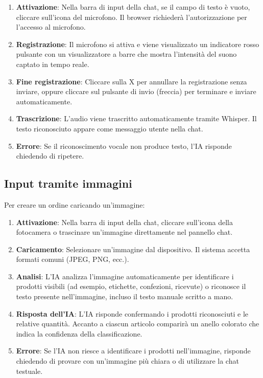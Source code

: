 \begin{enumerate}
    \item \textbf{Attivazione}: Nella barra di input della chat, se il campo di testo \`e vuoto, cliccare sull'icona del microfono. Il browser richieder\`a l'autorizzazione per l'accesso al microfono.
    \item \textbf{Registrazione}: Il microfono si attiva e viene visualizzato un indicatore rosso pulsante con un visualizzatore a barre che mostra l'intensit\`a del suono captato in tempo reale.
    \item \textbf{Fine registrazione}: Cliccare sulla X per annullare la registrazione senza inviare, oppure cliccare sul pulsante di invio (freccia) per terminare e inviare automaticamente.
    \item \textbf{Trascrizione}: L'audio viene trascritto automaticamente tramite Whisper. Il testo riconosciuto appare come messaggio utente nella chat.
    \item \textbf{Errore}: Se il riconoscimento vocale non produce testo, l'IA risponde chiedendo di ripetere.
\end{enumerate}

\subsection{Input tramite immagini}

Per creare un ordine caricando un'immagine:

\begin{enumerate}
    \item \textbf{Attivazione}: Nella barra di input della chat, cliccare sull'icona della fotocamera o trascinare un'immagine direttamente nel pannello chat.
    \item \textbf{Caricamento}: Selezionare un'immagine dal dispositivo. Il sistema accetta formati comuni (JPEG, PNG, ecc.).
    \item \textbf{Analisi}: L'IA analizza l'immagine automaticamente per identificare i prodotti visibili (ad esempio, etichette, confezioni, ricevute) o riconosce il testo presente nell'immagine, incluso il testo manuale scritto a mano.
    \item \textbf{Risposta dell'IA}: L'IA risponde confermando i prodotti riconosciuti e le relative quantit\`a. Accanto a ciascun articolo comparir\`a un anello colorato che indica la confidenza della classificazione.
    \item \textbf{Errore}: Se l'IA non riesce a identificare i prodotti nell'immagine, risponde chiedendo di provare con un'immagine pi\`u chiara o di utilizzare la chat testuale.
\end{enumerate}

